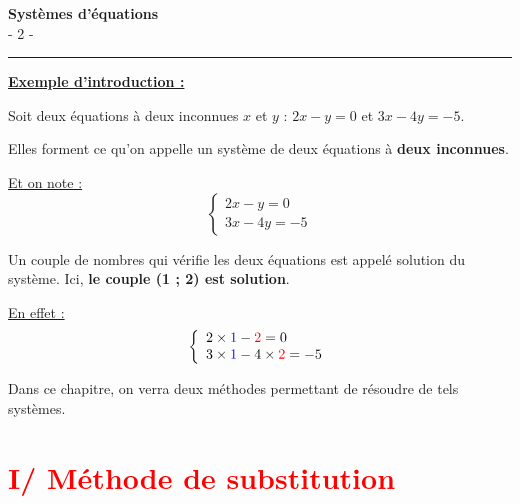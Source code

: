 \documentclass[12pt]{article}
\begin{document}

\newpage

\begin{center}
    {\LARGE \textbf{Systèmes d'équations}}\\[4mm]
    {\large - 2 -}
\end{center}

\vspace{10pt}
\hrule
\vspace{0pt}

\vspace{20pt}

{\color{RedOrange}\textbf{\underline{Exemple d'introduction :}}}

\vspace{10pt}
Soit deux équations à deux inconnues $x$ et $y$ :
$2x - y = 0$ et $3x - 4y = -5$.

\vspace{5pt}
Elles forment ce qu’on appelle un système de deux équations à \textbf{deux inconnues}.

\vspace{5pt}
\underline{Et on note :}
$$
\left\{
    \begin{array}{ll}
        2x - y = 0 \\
        3x - 4y = -5
    \end{array}
\right.
$$

Un couple de nombres qui vérifie les deux équations est appelé solution du système.
Ici, \textbf{le couple ({\color{blue}1} ; {\color{red}2}) est solution}. 

\vspace{10pt}
\underline{En effet :}
$$
\left\{
    \begin{array}{ll}
        2 \times {\color{blue}1} - {\color{red}2} = 0 \\
        3 \times {\color{blue}1} - 4 \times {\color{red}2} = -5
    \end{array}
\right.
$$

\vspace{10pt}
Dans ce chapitre, on verra deux méthodes permettant de résoudre de tels systèmes.


\section*{\textcolor{red}{I/ Méthode de substitution}}
\end{document}
